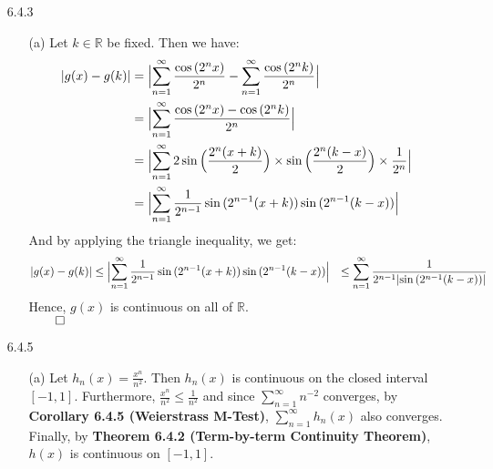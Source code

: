\documentclass[11pt]{article}
\DeclarePairedDelimiter\abs{\lvert}{\rvert}%
\DeclarePairedDelimiter\absb{\Big\lvert}{\Big\rvert}%
\newcommand{\reals}{\mathbb{R}}
\begin{document}
\begin{itemize}
    \item[6.4.3]
        \begin{itemize}
            \item[(a)]
                Let $k \in \reals$ be fixed. Then we have:
                \begin{align*}
                    \abs{g(x) - g(k)} &= \absb{\sum_{n = 1}^\infty
                    \frac{\cos{(2^nx)}}{2^n} - \sum_{n = 1}^\infty
                    \frac{\cos{(2^nk)}}{2^n}}\\
                                      &= \absb{\sum_{n = 1}^\infty \frac{\cos{(2^nx)} - \cos{(2^nk)}}{2^n}}\\
                                      &= \absb{\sum_{n = 1}^\infty 2\sin{\Big(\frac{2^n(x + k)}{2}\Big)} \times \sin{\Big(\frac{2^n(k - x)}{2}\Big) \times \frac{1}{2^n}}}\\
                                      &= \absb{\sum_{n = 1}^\infty \frac{1}{2^{n - 1}}\sin{(2^{n - 1}(x + k))}\sin{(2^{n - 1}(k - x))}}
                \end{align*}
                And by applying the triangle inequality, we get:
                \begin{align*}
                    \abs{g(x) - g(k)} &\leq \absb{\sum_{n = 1}^\infty \frac{1}{2^{n - 1}}\sin{(2^{n - 1}(x + k))}\sin{(2^{n - 1}(k - x))}}
                                      &\leq \sum_{n = 1}^\infty \frac{1}{2^{n - 1}\abs{\sin{(2^{n - 1}(k - x))}}}
                \end{align*}
                Hence, $g(x)$ is continuous on all of $\reals$.\\
                $\qed$
        \end{itemize}

    \item[6.4.5]
        \begin{itemize}
            \item[(a)]
                Let $h_n(x) = \frac{x^n}{n^2}$. Then $h_n(x)$ is continuous on
                the closed interval $[-1, 1]$. Furthermore, $\frac{x^n}{n^2}
                \leq \frac{1}{n^2}$ and since $\sum_{n = 1}^\infty n^{-2}$
                converges, by \textbf{Corollary 6.4.5 (Weierstrass M-Test)},
                $\sum_{n = 1}^\infty h_n(x)$ also converges. Finally, by
                \textbf{Theorem 6.4.2 (Term-by-term Continuity Theorem)},
                $h(x)$ is continuous on $[-1, 1]$.
        \end{itemize}
\end{itemize}

\end{document}
